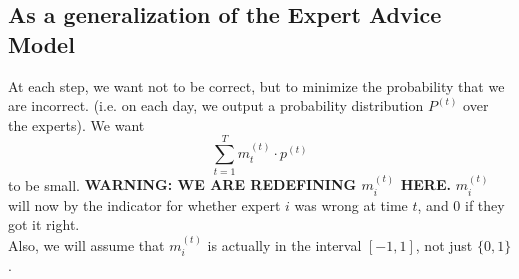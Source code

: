 \documentclass[11pt]{article}
\begin{document}
\subsection{As a generalization of the Expert Advice Model}
At each step, we want not to be correct, but to minimize the probability that we are incorrect. (i.e. on each day, we output a probability distribution $P^{(t)}$ over the experts). We want
\begin{equation}
\sum_{t=1}^T m_t^{(t)} \cdot p^{(t)}
\end{equation}
to be small. {\bf WARNING: WE ARE REDEFINING $m_i^{(t)}$ HERE.} $m_i^{(t)}$ will now by the indicator for whether expert $i$ was wrong at time $t$, and 0 if they got it right.\medskip\\
Also, we will assume that $m_i^(t)$ is actually in the interval $[-1,1]$, not just $\{0,1\}$.
\end{document}
